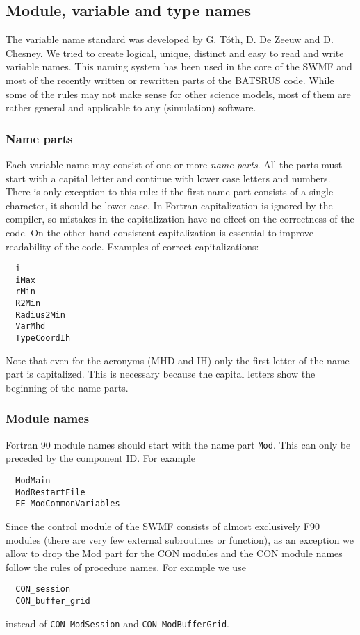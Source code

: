\documentclass{article}
\begin{document}
\subsection{Module, variable and type names}

The variable name standard was developed by G. T\'oth, D. De Zeeuw
and D. Chesney. We tried to create logical, unique, distinct and easy 
to read and write variable names. This naming system has been used in 
the core of the SWMF and most of the recently written or rewritten parts
of the BATSRUS code. While some of the rules may not make sense for other
science models, most of them are rather general and applicable to any
(simulation) software.

\subsubsection{Name parts}

Each variable name may consist of one or more {\it name parts}.
All the parts must start with a capital letter and continue
with lower case letters and numbers. There is only exception
to this rule: if the first name part consists of a single 
character, it should be lower case. In Fortran capitalization is ignored
by the compiler, so mistakes in the capitalization
have no effect on the correctness of the code. On the other hand
consistent capitalization is essential to improve readability of the code.
Examples of correct capitalizations:
\begin{verbatim}
  i
  iMax
  rMin
  R2Min
  Radius2Min
  VarMhd
  TypeCoordIh
\end{verbatim}
Note that even for the acronyms (MHD and IH) 
only the first letter of the name part is capitalized. 
This is necessary because the capital letters show the
beginning of the name parts. 

\subsubsection{Module names}

Fortran 90 module names should start with the name part {\tt Mod}. 
This can only be preceded by the component ID. For example
\begin{verbatim}
  ModMain
  ModRestartFile
  EE_ModCommonVariables
\end{verbatim}
Since the control module of the SWMF consists of almost exclusively 
F90 modules (there are very few external subroutines or function), 
as an exception we allow to drop the Mod part for the CON modules
and the CON module names follow the rules of procedure names.
For example we use
\begin{verbatim}
  CON_session
  CON_buffer_grid
\end{verbatim}
instead of {\tt CON\_ModSession} and {\tt CON\_ModBufferGrid}.
\end{document}
